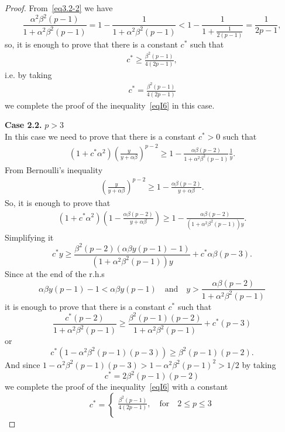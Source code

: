 \documentclass{amsart}
\theoremstyle{definition}
\theoremstyle{remark}
\numberwithin{equation}{section}
\begin{document}
\begin{proof}
	
	
From~\eqref{eq3.2-2} we have
\[
\frac{\alpha^2 \beta^2(p-1)}{1+\alpha^2\beta^2(p-1)}=1-\frac{1}{1+\alpha^2\beta^2(p-1)}
 < 1-\frac{1}{1+\frac{1}{2(p-1)}}= \frac{1}{2p-1},
\]
so, it is enough to prove that there is a constant $c^*$ such that
\begin{align*}
c^* \geq \frac{\beta^2(p-1)}{4(2p-1)},
 	\end{align*}	
i.e. by taking	
\begin{align*}
c^* =  \frac{\beta^2(p-1)}{4(2p-1)}
 	\end{align*}	
we complete the proof of the inequality~\eqref{eqI6}  in this case.	
	
	
\textbf{Case 2.2.} $p> 3$\\
In this case we need to prove that there is a constant $c^*>0$ such that
	\begin{align*}
\left(1+c^*\alpha^2\right)\left(\frac{y}{y+\alpha \beta}\right)^{p-2}
\geq 1-\frac{\alpha\beta(p-2)}{1+\alpha^2\beta^2(p-1)}\frac{1}{y} .
\end{align*}	
	From Bernoulli's inequality
	\begin{align*}
\left(\frac{y}{y+\alpha \beta}\right)^{p-2}
\geq 1-\frac{ \alpha\beta(p-2)}{y+\alpha \beta }. 
\end{align*}
	So, it is enough to prove that 
	\begin{align*}
  \left(1+c^*\alpha^2\right)\left( 1-\frac{\alpha \beta(p-2)}{y+\alpha \beta} \right)
	\geq 1-\frac{\alpha \beta(p-2)}{(1+\alpha^2\beta^2( p-1))y}.
\end{align*}
Simplifying it
\[
c^*y\geq \frac{\beta^2(p-2)(\alpha\beta y(p-1)-1)}{\left(1+\alpha^2\beta^2(p-1)\right)y}
+c^*\alpha\beta(p-3).
\]
Since at the end of the r.h.s
\[
\alpha\beta y(p-1)-1<\alpha\beta y(p-1)\quad \mbox{and}\quad y> \frac{\alpha\beta (p-2)}{1+\alpha^2\beta^2(p-1)}
\]
it is enough to prove that there is a constant $c^*$ such that
\[
\frac{c^*(p-2)}{1+\alpha^2\beta^2(p-1)}\geq \frac{\beta^2(p-1)(p-2)}{1+\alpha^2\beta^2(p-1)}
+c^*(p-3)
\]
or
\[
c^*\left( 1-\alpha^2\beta^2(p-1)(p-3) \right)    \geq \beta^2(p-1)(p-2).
\]
And since $1-\alpha^2\beta^2(p-1)(p-3)>1-\alpha^2\beta^2(p-1)^2>1/2$
 by taking 
\[
c^*=   2\beta^2(p-1)(p-2)
\]
we complete the proof of the inequality~\eqref{eqI6} with a constant 
 \begin{equation*}\label{eqlem32}
  c^*=
  \begin{cases}
         \frac{\beta^2(p-1)}{4(2p-1)}, \quad\mbox{for}\quad 2\le p\le3\\

\end{cases}
\end{equation*}
\end{proof}
\end{document}
